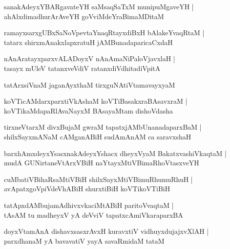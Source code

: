 \documentclass[twoside,12pt,openright]{book}
\newcounter{shloka}[chapter]
\begin{document}
\begin{shloka}%
sanakAdeyxYBARgavateYH saMsaqSaTxM munipuMgaveYH |\\
ahAlxdimadhurArAveYH goVviMdeYraBimaMDitaM 
\end{shloka}

\begin{shloka}%
ramayxsarxgUBxSaNoVpevtaYnaqRtayxdiBxH bAlakeYvaqRtaM |\\
tatarx shirxmAnakxlapxratuH jAMBunadaparicaCxdaH 
\end{shloka}

\begin{shloka}%
nAnAratayxparxvALADoyxV nAnAmaNiPaloVjavxlaH |\\
tasayx mUleV tatanxveVdiV ratanxdiVdhitadiVpitA 
\end{shloka}

\begin{shloka}%
tatArxsiVnaM jaganAyxthaM tirxguNAtiVtamavayxyaM 
\end{shloka}

\begin{shloka}%
koVTicAMdarxparxtiVkAshaM koVTiBasakxraBAsavxraM |\\
koVTikaMdapaRlAvaNayxM BAsayaMtam dishoVdasha
\end{shloka}

\begin{shloka}%
tirxneVtarxM divxBujaM gwraM tapatxjAMbUnanadaparxBaM |\\
shilxSayxmANaM cAMganABiH sudAmAnAM ca saravxshaH 
\end{shloka}

\begin{shloka}%
barxhAmxdeyxYsasxnakAdeyxYshacx dheyxVyaM BakatxvashiVkaqtaM |\\
mudA GUNirtaneVtArxVBiH naYtayxMtiVBimaRhoVtasxveYH 
\end{shloka}

\begin{shloka}%
cuMbatiVBihaRsaMtiVBiH shilxSayxMtiVBimuRhumuRhuH |\\
avApatxgoVpiVdeVhABiH shurxtiBiH koVTikoVTiBiH
\end{shloka}

\begin{shloka}%
tatApxdAMbujamAdhivxvkaciMtABiH paritoVvaqtaM |\\
tAsAM tu madheyxV yA deVviV tapatxcAmiVkaraparxBA
\end{shloka}

\begin{shloka}%
doyxVtamAnA dishavxsasxrAvxH kuravxtiV vidhuyxdujajxvXlAH |\\
parxdhanaM yA bavavatiV yayA savaRmidaM tataM 
\end{shloka}
\end{document}
